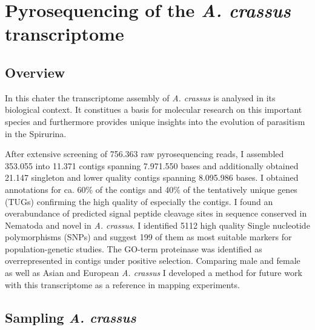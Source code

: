 
\chapter{Pyrosequencing of the \textit{A. crassus}
  transcriptome} %
\label{cha:pyro}



\ifpdf
    \graphicspath{{5_pyro/figures/PNG/}{5_pyro/figures/PDF/}{5_pyro/figures/}}
\else
    \graphicspath{{5_pyro/figures/EPS/}{5_pyro/figures/}}
\fi


\section{Overview}
\label{sec:454-overv}

In this chater the transcriptome assembly of \textit{A. crassus} is
analysed in its biological context. It constitues a basis for
molecular research on this important species and furthermore provides
unique insights into the evolution of parasitism in the Spirurina.

After extensive screening of 756.363 raw pyrosequencing reads, I
assembled 353.055 into 11.371 contigs spanning 7.971.550 bases and
additionally obtained 21.147 singleton and lower quality contigs
spanning 8.095.986 bases. I obtained annotations for ca. 60\% of the
contigs and 40\% of the tentatively unique genes (TUGs) confirming the
high quality of especially the contigs. I found an overabundance of
predicted signal peptide cleavage sites in sequence conserved in
Nematoda and novel in \textit{A. crassus}. I identified 5112 high
quality Single nucleotide polymorphisms (SNPs) and suggest 199 of them
as most suitable markers for population-genetic studies. The GO-term
proteinase was identified as overrepresented in contigs under positive
selection. Comparing male and female as well as Asian and European
\textit{A. crassus} I developed a method for future work with this
transcriptome as a reference in mapping experiments.

\section{Sampling \textit{A. crassus}}

